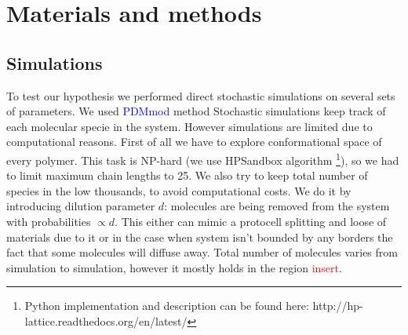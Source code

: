 \documentclass[journal=jacsat,manuscript=article,layout=twocolumn]{achemso}
\newcommand*{\red}[1]{\textcolor{red}{#1}}
\newcommand*{\blue}[1]{\textcolor{blue}{#1}}
\begin{document}
\section{Materials and methods}\label{sec:mat}
\subsection{Simulations}\label{sec:mat-sim}
To test our hypothesis we performed direct stochastic simulations on several sets of parameters. We 
used 
\blue{PDMmod} method \cite{Bernatskiy}
Stochastic simulations keep track of each 
molecular specie in the system. However simulations are limited due to computational reasons. 
First 
of all we have to explore conformational space of every polymer. This task is NP-hard (we use 
HPSandbox algorithm\cite{lau1989lattice,Dill2008} \footnote{Python implementation and description 
can be found here: http://hp-lattice.readthedocs.org/en/latest/}), so we had to limit 
maximum chain lengths to 25. We also try to keep total number of species in the low thousands, to 
avoid computational costs. We do it by introducing dilution parameter $d$: molecules are being 
removed from the system with probabilities $\propto d$. 
This either can mimic a protocell splitting and loose of materials due to it or in the case when 
system isn't bounded by any borders the fact that some molecules will diffuse away. Total number of 
molecules varies from simulation to simulation, 
however it mostly holds in the region \red{insert}.
\end{document}
